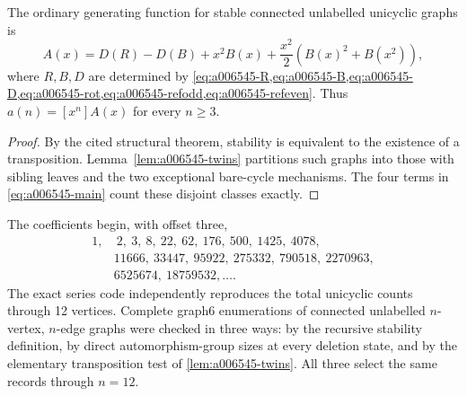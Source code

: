 \begin{theorem}
\label{thm:a006545}
The ordinary generating function for stable connected unlabelled unicyclic
graphs is
\begin{equation}
 \boxed{
 A(x)=D(R)-D(B)+x^2B(x)+
       \frac{x^2}{2}\left(B(x)^2+B(x^2)\right),}
 \label{eq:a006545-main}
\end{equation}
where \(R,B,D\) are determined by
\cref{eq:a006545-R,eq:a006545-B,eq:a006545-D,eq:a006545-rot,eq:a006545-refodd,eq:a006545-refeven}.
Thus \(a(n)=[x^n]A(x)\) for every \(n\ge3\).
\end{theorem}

\begin{proof}
By the cited structural theorem, stability is equivalent to the existence of a
transposition.  Lemma~\ref{lem:a006545-twins} partitions such graphs into those
with sibling leaves and the two exceptional bare-cycle mechanisms.  The four
terms in \cref{eq:a006545-main} count these disjoint classes exactly.
\end{proof}

The coefficients begin, with offset three,
\[
\begin{aligned}
1,&\ 2,\ 3,\ 8,\ 22,\ 62,\ 176,\ 500,\ 1425,\ 4078,\\
&11666,\ 33447,\ 95922,\ 275332,\ 790518,\ 2270963,\\
&6525674,\ 18759532,\ldots.
\end{aligned}
\]
The exact series code independently reproduces the total unicyclic counts
through 12 vertices.  Complete graph6 enumerations of connected unlabelled
\(n\)-vertex, \(n\)-edge graphs were checked in three ways: by the recursive
stability definition, by direct automorphism-group sizes at every deletion
state, and by the elementary transposition test of
\cref{lem:a006545-twins}.  All three select the same records through
\(n=12\).
